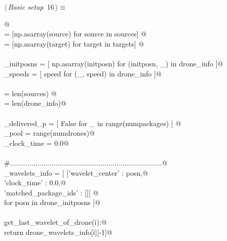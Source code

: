 \documentclass[10pt, english, oneside]{report}
\begin{document}
\begin{flushleft} \small
\begin{minipage}{\linewidth}\label{scrap15}\raggedright\small
{} $\langle\,${\itshape Basic setup}\nobreak\ {\footnotesize {16}}$\,\rangle\equiv$
\vspace{-1ex}
\begin{list}{}{} \item
\mbox{}\verb@ @\\
\mbox{}\verb@sources             = [np.asarray(source) for source in sources] @\\
\mbox{}\verb@targets             = [np.asarray(target) for target in targets] @\\
\mbox{}\verb@@\\
\mbox{}\verb@drone_initposns     = [ np.asarray(initposn) for (initposn, _) in drone_info ]@\\
\mbox{}\verb@drone_speeds        = [ speed                for (_,    speed) in drone_info ]@\\
\mbox{}\verb@@\\
\mbox{}\verb@numpackages         = len(sources) @\\
\mbox{}\verb@numdrones           = len(drone_info)@\\
\mbox{}\verb@@\\
\mbox{}\verb@package_delivered_p = [ False for _ in range(numpackages) ] @\\
\mbox{}\verb@drone_pool          = range(numdrones)@\\
\mbox{}\verb@global_clock_time   = 0.0@\\
\mbox{}\verb@@\\
\mbox{}\verb@#.............................................................................@\\
\mbox{}\verb@drone_wavelets_info = [ [{'wavelet_center'        : posn,@\\
\mbox{}\verb@                          'clock_time'            : 0.0,@\\
\mbox{}\verb@                          'matched_package_ids'   : []}] @\\
\mbox{}\verb@                        for posn in drone_initposns ]@\\
\mbox{}\verb@@\\
\mbox{}\verb@def get_last_wavelet_of_drone(i):@\\
\mbox{}\verb@         return drone_wavelets_info[i][-1]@\\
\mbox{}\verb@@\\

\end{list}
\end{minipage}
\end{flushleft}
\end{document}
